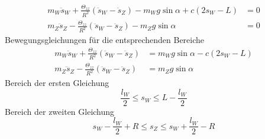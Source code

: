 \begin{align*}
	 m_W \ddot{s}_W + \frac{\Theta_{zz}}{R^2}(\ddot{s}_W - \ddot{s}_Z) -  m_W g \sin\alpha + c(2s_W - L) &= 0 \\
	 m_Z\ddot{s}_Z - \frac{\Theta_{zz}}{R^2}(\ddot{s}_W - \ddot{s}_Z) -  m_Z g \sin\alpha &= 0
\end{align*}
\newpage
\noindent
Bewegungsgleichungen für die entsprechenden Bereiche
\begin{align*}
	 m_W \ddot{s}_W + \frac{\Theta_{zz}}{R^2}(\ddot{s}_W - \ddot{s}_Z) &= m_W g \sin\alpha - c(2s_W - L) \\
	 m_Z\ddot{s}_Z - \frac{\Theta_{zz}}{R^2}(\ddot{s}_W - \ddot{s}_Z) &=  m_Z g \sin\alpha
\end{align*}
Bereich der ersten Gleichung
\[
	\frac{l_W}{2} \leq s_W \leq L - \frac{l_W}{2}
\]
Bereich der zweiten Gleichung
\[
	s_W - \frac{l_W}{2} + R \leq s_Z \leq s_W + \frac{l_W}{2} - R
\]